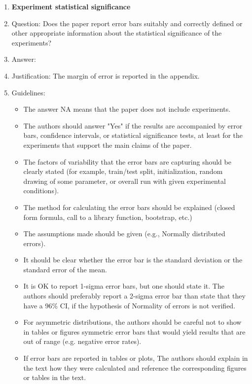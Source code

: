 \documentclass{article}
\begin{document}
\begin{enumerate}
\item {\bf Experiment statistical significance}
    \item[] Question: Does the paper report error bars suitably and correctly defined or other appropriate information about the statistical significance of the experiments?
    \item[] Answer: \answerYes{} %
    \item[] Justification: The margin of error is reported in the appendix.
    \item[] Guidelines:
    \begin{itemize}
        \item The answer NA means that the paper does not include experiments.
        \item The authors should answer "Yes" if the results are accompanied by error bars, confidence intervals, or statistical significance tests, at least for the experiments that support the main claims of the paper.
        \item The factors of variability that the error bars are capturing should be clearly stated (for example, train/test split, initialization, random drawing of some parameter, or overall run with given experimental conditions).
        \item The method for calculating the error bars should be explained (closed form formula, call to a library function, bootstrap, etc.)
        \item The assumptions made should be given (e.g., Normally distributed errors).
        \item It should be clear whether the error bar is the standard deviation or the standard error of the mean.
        \item It is OK to report 1-sigma error bars, but one should state it. The authors should preferably report a 2-sigma error bar than state that they have a 96\% CI, if the hypothesis of Normality of errors is not verified.
        \item For asymmetric distributions, the authors should be careful not to show in tables or figures symmetric error bars that would yield results that are out of range (e.g. negative error rates).
        \item If error bars are reported in tables or plots, The authors should explain in the text how they were calculated and reference the corresponding figures or tables in the text.
    \end{itemize}


\end{enumerate}
\end{document}
